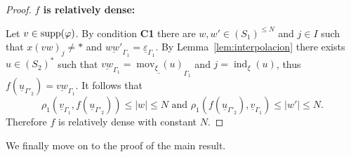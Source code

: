 \documentclass{article}
\theoremstyle{definition}
\theoremstyle{definition}
\newcommand{\mov}{\operatorname{mov}}
\newcommand{\ind}{\operatorname{ind}}
\newcommand{\supp}{\textnormal{supp}}
\begin{document}
\begin{proof}
\noindent
\textbf{$f$ is relatively dense:} 

Let $v \in \supp(\varphi)$. By condition \textbf{C1} there are $w,w'\in (S_1)^{\leq N}$ and $j \in I$ such that $x(vw)_j \neq \ast$ and $\underline{ww'}_{\Gamma_1}=\underline{\varepsilon}_{\Gamma_1}$. By Lemma~\ref{lem:interpolacion}
there exists $u \in (S_2)^*$ such that $\underline{vw}_{\Gamma_1} = \underline{\mov_{\xi}(u)}_{\Gamma_1}$ and $j = \ind_{\xi}(u)$, thus $f(\underline{u}_{\Gamma'_2}) = \underline{vw}_{\Gamma_1}$. It follows that \[ \rho_1(\underline{v}_{\Gamma_1},f(\underline{u}_{\Gamma'_2})) \leq |w| \leq N \mbox{ and } \rho_1(f(\underline{u}_{\Gamma'_2}),\underline{v}_{\Gamma_1}) \leq |w'| \leq N.  \]
Therefore $f$ is relatively dense with constant $N$.
\end{proof}

We finally move on to the proof of the main result.
\end{document}
